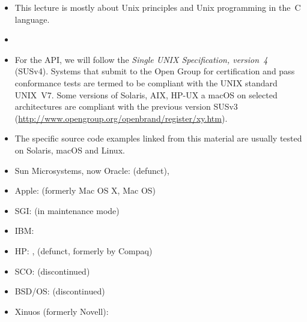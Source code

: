 \pagebreak

\begin{slide}
\end{slide}

\begin{itemize}
\item This lecture is mostly about Unix principles and Unix programming in the~C
language.
\item {}
\item For the API, we will follow the \emph{Single UNIX Specification,
version~4} (SUSv4). Systems that submit to the Open Group for certification and
pass conformance tests are termed to be compliant with the UNIX standard
UNIX~V7.  Some versions of Solaris, AIX, HP-UX a macOS on selected architectures
are compliant with the previous version SUSv3
(\url{http://www.opengroup.org/openbrand/register/xy.htm}).
\item The specific source code examples linked from this material are usually
tested on Solaris, macOS and Linux.
\end{itemize}


\begin{slide}
\end{slide}


\begin{slide}

\begin{itemize}
\item Sun Microsystems, now Oracle:  (defunct), 
\item Apple:  (formerly Mac OS X, Mac OS)
\item SGI:  (in maintenance mode)
\item IBM: 
\item HP: ,  (defunct, formerly by Compaq)
\item SCO:  (discontinued)
\item BSD/OS:  (discontinued)
\item Xinuos (formerly Novell): 
\end{itemize}
\end{slide}

